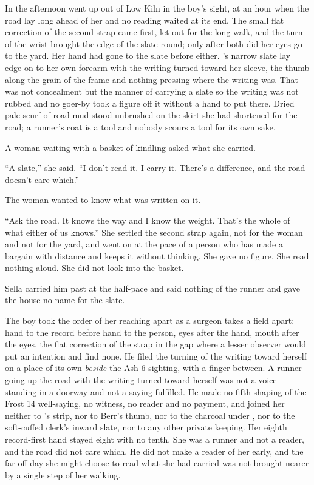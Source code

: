 \scenebreak

In the afternoon  went up  out of Low Kiln in the boy's sight, at an hour when the road lay long ahead of her and no reading waited at its end. The small flat correction of the second strap came first, let out for the long walk, and the turn of the wrist brought the edge of the slate round; only after both did her eyes go to the yard. Her hand had gone to the slate before either. 's narrow slate lay edge-on to her own forearm with the writing turned toward her sleeve, the thumb along the grain of the frame and nothing pressing where the writing was. That was not concealment but the manner of carrying a slate so the writing was not rubbed and no goer-by took a figure off it without a hand to put there. Dried pale scurf of road-mud stood unbrushed on the skirt she had shortened for the road; a runner's coat is a tool and nobody scours a tool for its own sake.

A woman waiting with a basket of kindling asked what she carried.

“A slate,” she said. “I don't read it. I carry it. There's a difference, and the road doesn't care which.”

The woman wanted to know what was written on it.

“Ask the road. It knows the way and I know the weight. That's the whole of what either of us knows.” She settled the second strap again, not for the woman and not for the yard, and went on at the pace of a person who has made a bargain with distance and keeps it without thinking. She gave no figure. She read nothing aloud. She did not look into the basket.

Sella carried him past at the half-pace and said nothing of the runner and gave the house no name for the slate.

The boy took the order of her reaching apart as a surgeon takes a field apart: hand to the record before hand to the person, eyes after the hand, mouth after the eyes, the flat correction of the strap in the gap where a lesser observer would put an intention and find none. He filed the turning of the writing toward herself on a place of its own \emph{beside} the Ash 6 sighting, with a finger between. A runner going up the road with the writing turned toward herself was not a voice standing in a doorway and not a saying fulfilled. He made no fifth shaping of the Frost 14 well-saying, no witness, no reader and no payment, and joined her neither to 's strip, nor to Berr's thumb, nor to the charcoal under , nor to the soft-cuffed clerk's inward slate, nor to any other private keeping. Her eighth record-first hand stayed eight with no tenth. She was a runner and not a reader, and the road did not care which. He did not make a reader of her early, and the far-off day she might choose to read what she had carried was not brought nearer by a single step of her walking.

